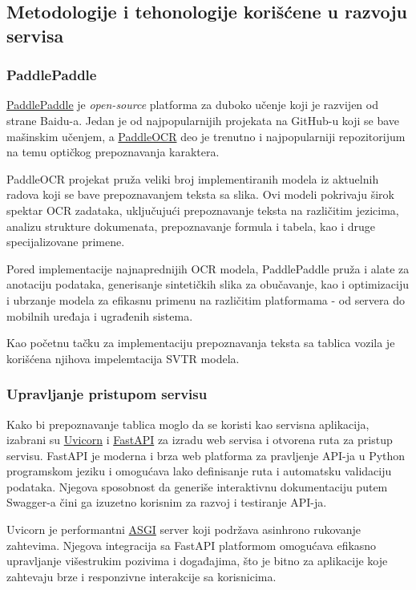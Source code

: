 \documentclass[a4paper,12pt]{article}
\begin{document}
	\subsection{Metodologije i tehonologije korišćene u razvoju servisa}
	\subsubsection{PaddlePaddle}
	\href{https://github.com/PaddlePaddle}{PaddlePaddle} je \textit{open-source} platforma za duboko učenje koji je razvijen od strane Baidu-a. Jedan je od najpopularnijih projekata na GitHub-u koji se bave mašinskim učenjem, a \href{https://github.com/PaddlePaddle/PaddleOCR}{PaddleOCR} deo je trenutno i najpopularniji repozitorijum na temu optičkog prepoznavanja karaktera.
	
	PaddleOCR projekat pruža veliki broj implementiranih modela iz aktuelnih radova koji se bave prepoznavanjem teksta sa slika. Ovi modeli pokrivaju širok spektar OCR zadataka, uključujući prepoznavanje teksta na različitim jezicima, analizu strukture dokumenata, prepoznavanje formula i tabela, kao i druge specijalizovane primene.
	
	Pored implementacije najnaprednijih OCR modela, PaddlePaddle pruža i alate za anotaciju podataka, generisanje sintetičkih slika za obučavanje, kao i optimizaciju i ubrzanje modela za efikasnu primenu na različitim platformama - od servera do mobilnih uređaja i ugrađenih sistema.
	
	Kao početnu tačku za implementaciju prepoznavanja teksta sa tablica vozila je korišćena njihova impelemtacija SVTR modela.
	
	\subsubsection{Upravljanje pristupom servisu}
	Kako bi prepoznavanje tablica moglo da se koristi kao servisna aplikacija, izabrani su \href{https://www.uvicorn.org/}{Uvicorn} i \href{https://fastapi.tiangolo.com/}{FastAPI} za izradu web servisa i otvorena ruta za pristup servisu. FastAPI je moderna i brza web platforma za pravljenje API-ja u Python programskom jeziku i omogućava lako definisanje ruta i automatsku validaciju podataka. Njegova sposobnost da generiše interaktivnu dokumentaciju putem Swagger-a čini ga izuzetno korisnim za razvoj i testiranje API-ja.
	
	Uvicorn je performantni \href{https://en.wikipedia.org/wiki/Asynchronous_Server_Gateway_Interface}{ASGI} server koji podržava asinhrono rukovanje zahtevima. Njegova integracija sa FastAPI platformom omogućava efikasno upravljanje višestrukim pozivima i događajima, što je bitno za aplikacije koje zahtevaju brze i responzivne interakcije sa korisnicima. 
	
\end{document}
